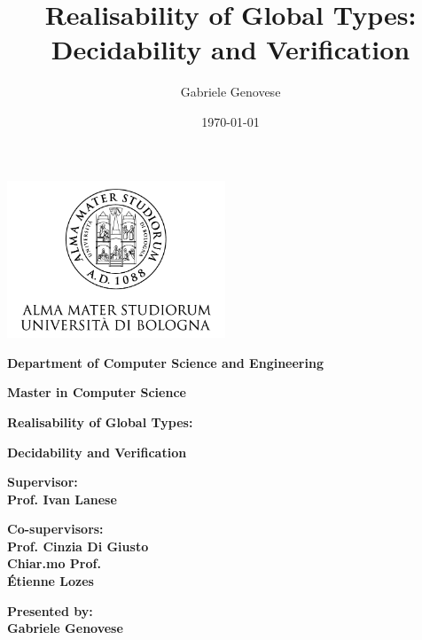 \documentclass[12pt,a4paper,twoside]{book}
\title{Realisability of Global Types: Decidability and Verification}
\author{Gabriele Genovese}
\date{\today}
\theoremstyle{definition}
\theoremstyle{definition}
\theoremstyle{definition}
\begin{document}
\begin{titlepage}
\begin{center}
    \includegraphics[width=6.5cm,height=4.7cm]{img/unibo.png}
    
    \vspace{10mm}
   
    {\large{\bf{Department of Computer Science and Engineering}}} 
    
    \vspace{5mm}

    {\Large{\bf{Master in Computer Science}}}
    
    \vspace{15mm}
    
    {\Huge{\bf Realisability of Global Types: }}\\
    
    \vspace{3mm}
    
    {\Huge{\bf Decidability and Verification }}\\
   
    \vspace{3mm}
\end{center}

\vspace{10mm}

\begin{minipage}[t]{0.45\textwidth}
    
    {\large{\bf Supervisor: \\ Prof. Ivan Lanese}}
    
    \vspace{3mm}
    
    {\large{\bf Co-supervisors:\\Prof. Cinzia Di Giusto\\Chiar.mo Prof.\\Étienne Lozes}}
\end{minipage}
\hfill
\begin{minipage}[t]{0.37\textwidth}\raggedleft
    {\large{\bf Presented by: \\ Gabriele Genovese}}\\
    

\end{minipage}
\end{titlepage}
\end{document}
